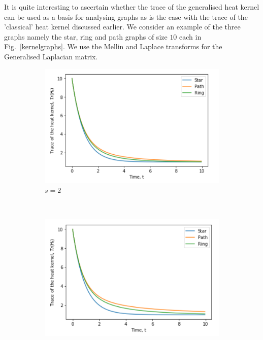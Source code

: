 \documentclass[10pt,a4paper]{article}
\begin{document}
        It is quite interesting to ascertain whether the trace of the generalised heat kernel can be used as a basis for analysing graphs as is the case with the trace of the 'classical' heat kernel discussed earlier.
        We consider an example of the three graphs namely the star, ring and path graphs of size $10$ each in Fig.~\ref{kernelgraphs}. We use the Mellin and Laplace transforms for the Generalised Laplacian matrix.
        \begin{figure}[H]
        	\centering
        	\begin{subfigure}[b]{0.35\textwidth}
        		\includegraphics[width= \textwidth]{images/graphskernelmellin2.png}
        		\caption{$s=2$}
        		\label{threegraphMellin2}
        	\end{subfigure}~
        	\begin{subfigure}[b]{0.35\textwidth}
        		\includegraphics[width= \textwidth]{images/graphskernelmellin3.png}

\end{subfigure}
\end{figure}
\end{document}
